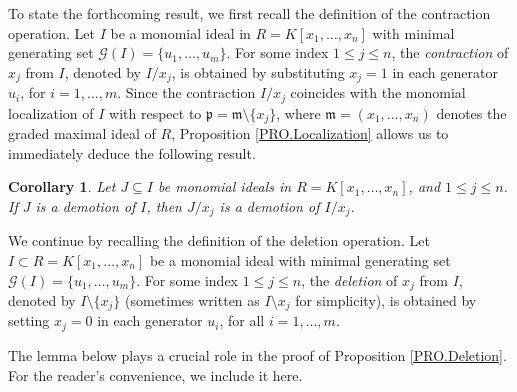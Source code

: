 \documentclass[11pt]{amsart}
\newtheorem{corollary}[theorem]{Corollary}
\begin{document}

To state the forthcoming result, we first recall the definition of the contraction operation. Let $I$ be a monomial ideal in $R = K[x_1, \ldots, x_n]$ with minimal generating set $\mathcal{G}(I) =\{u_1, \ldots, u_m\}$. For some index $1 \leq j \leq n$, the \emph{contraction} of $x_j$ from $I$, denoted by $I / x_j$, is obtained by substituting $x_j = 1$ in each generator $u_i$, for $i = 1, \ldots, m$.
Since the contraction $I / x_j$ coincides with the monomial localization of $I$ with respect to $\mathfrak{p} = \mathfrak{m} \setminus \{x_j\}$, where $\mathfrak{m} = (x_1, \ldots, x_n)$ denotes the graded maximal ideal of $R$, Proposition \ref{PRO.Localization} allows us to immediately deduce the following result.
 
 \begin{corollary}\label{Cor. contraction}
 Let  $J \subseteq I$ be monomial ideals in  $R=K[x_1, \ldots, x_n]$, and     $1\leq j \leq n$.  If  $J$ is a demotion of $I$, then  $J/x_j$ 
is a demotion of    $I/x_j$. 
 \end{corollary}


We continue by recalling the definition of the deletion operation. Let $I \subset R = K[x_1, \ldots, x_n]$ be a monomial ideal with minimal 
generating set $\mathcal{G}(I) = \{u_1, \ldots, u_m\}$. For some index $1 \leq j \leq n$, the \emph{deletion} of $x_j$ from $I$, denoted by 
$I \setminus \{x_j\}$ (sometimes written as $I \setminus x_j$ for simplicity), is obtained by setting $x_j = 0$ in each generator $u_i$, for all $i = 1, \ldots, m$.

  
The lemma below plays a crucial role in the proof of Proposition \ref{PRO.Deletion}. For the reader’s convenience, we include it here.
\end{document}
